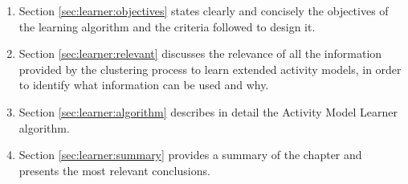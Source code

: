 \begin{enumerate}
 \item Section \ref{sec:learner:objectives} states clearly and concisely the objectives of the learning algorithm and the criteria followed to design it.
 \item Section \ref{sec:learner:relevant} discusses the relevance of all the information provided by the clustering process to learn extended activity models, in order to identify what information can be used and why.
 \item Section \ref{sec:learner:algorithm} describes in detail the Activity Model Learner algorithm.
 \item Section \ref{sec:learner:summary} provides a summary of the chapter and presents the most relevant conclusions.
\end{enumerate}
